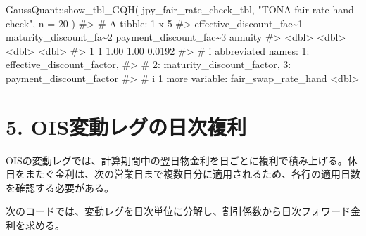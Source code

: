 \documentclass[
  letterpaper,
  DIV=11,
  numbers=noendperiod]{scrreprt}
\newenvironment{Shaded}{\begin{snugshade}}{\end{snugshade}}
\newcommand{\AttributeTok}[1]{\textcolor[rgb]{0.40,0.45,0.13}{#1}}
\newcommand{\CommentTok}[1]{\textcolor[rgb]{0.37,0.37,0.37}{#1}}
\newcommand{\DecValTok}[1]{\textcolor[rgb]{0.68,0.00,0.00}{#1}}
\newcommand{\FunctionTok}[1]{\textcolor[rgb]{0.28,0.35,0.67}{#1}}
\newcommand{\NormalTok}[1]{\textcolor[rgb]{0.00,0.23,0.31}{#1}}
\newcommand{\SpecialCharTok}[1]{\textcolor[rgb]{0.37,0.37,0.37}{#1}}
\newcommand{\StringTok}[1]{\textcolor[rgb]{0.13,0.47,0.30}{#1}}
\begin{document}
\begin{Shaded}
\begin{Highlighting}[]
\NormalTok{GaussQuant}\SpecialCharTok{::}\FunctionTok{show\_tbl\_GQH}\NormalTok{(}
\NormalTok{  jpy\_fair\_rate\_check\_tbl,}
  \StringTok{"TONA fair{-}rate hand check"}\NormalTok{,}
  \AttributeTok{n =} \DecValTok{20}
\NormalTok{)}
\CommentTok{\#\textgreater{} \# A tibble: 1 x 5}
\CommentTok{\#\textgreater{}   effective\_discount\_fac\textasciitilde{}1 maturity\_discount\_fa\textasciitilde{}2 payment\_discount\_fac\textasciitilde{}3 annuity}
\CommentTok{\#\textgreater{}                      \textless{}dbl\textgreater{}                  \textless{}dbl\textgreater{}                  \textless{}dbl\textgreater{}   \textless{}dbl\textgreater{}}
\CommentTok{\#\textgreater{} 1                        1                   1.00                   1.00  0.0192}
\CommentTok{\#\textgreater{} \# i abbreviated names: 1: effective\_discount\_factor,}
\CommentTok{\#\textgreater{} \#   2: maturity\_discount\_factor, 3: payment\_discount\_factor}
\CommentTok{\#\textgreater{} \# i 1 more variable: fair\_swap\_rate\_hand \textless{}dbl\textgreater{}}
\end{Highlighting}
\end{Shaded}

\section{5.
OIS変動レグの日次複利}\label{oisux5909ux52d5ux30ecux30b0ux306eux65e5ux6b21ux8907ux5229}

OISの変動レグでは、計算期間中の翌日物金利を日ごとに複利で積み上げる。休日をまたぐ金利は、次の営業日まで複数日分に適用されるため、各行の適用日数を確認する必要がある。

次のコードでは、変動レグを日次単位に分解し、割引係数から日次フォワード金利を求める。
\end{document}
